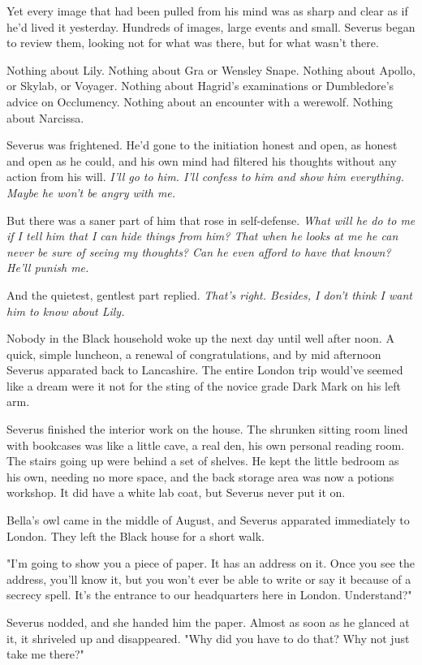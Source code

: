 Yet every image that had been pulled from his mind was as sharp and clear as if he'd lived it yesterday. Hundreds of images, large events and small. Severus began to review them, looking not for what was there, but for what wasn't there.

Nothing about Lily. Nothing about Gra or Wensley Snape. Nothing about Apollo, or Skylab, or Voyager. Nothing about Hagrid's examinations or Dumbledore's advice on Occlumency. Nothing about an encounter with a werewolf. Nothing about Narcissa.

Severus was frightened. He'd gone to the initiation honest and open, as honest and open as he could, and his own mind had filtered his thoughts without any action from his will. \emph{I'll go to him. I'll confess to him and show him everything. Maybe he won't be angry with me.}

But there was a saner part of him that rose in self-defense. \emph{What will he do to me if I tell him that I can hide things from him? That when he looks at me he can never be sure of seeing my thoughts? Can he even afford to have that known? He'll punish me.}

And the quietest, gentlest part replied. \emph{That's right. Besides, I don't think I want him to know about Lily.}

Nobody in the Black household woke up the next day until well after noon. A quick, simple luncheon, a renewal of congratulations, and by mid afternoon Severus apparated back to Lancashire. The entire London trip would've seemed like a dream were it not for the sting of the novice grade Dark Mark on his left arm.

Severus finished the interior work on the house. The shrunken sitting room lined with bookcases was like a little cave, a real den, his own personal reading room. The stairs going up were behind a set of shelves. He kept the little bedroom as his own, needing no more space, and the back storage area was now a potions workshop. It did have a white lab coat, but Severus never put it on.

Bella's owl came in the middle of August, and Severus apparated immediately to London. They left the Black house for a short walk.

"I'm going to show you a piece of paper. It has an address on it. Once you see the address, you'll know it, but you won't ever be able to write or say it because of a secrecy spell. It's the entrance to our headquarters here in London. Understand?"

Severus nodded, and she handed him the paper. Almost as soon as he glanced at it, it shriveled up and disappeared. "Why did you have to do that? Why not just take me there?"


